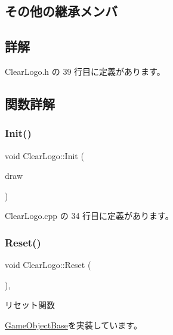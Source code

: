\subsection*{その他の継承メンバ}


\subsection{詳解}


 Clear\+Logo.\+h の 39 行目に定義があります。



\subsection{関数詳解}
\mbox{\label{class_clear_logo_a46c1a948342d75bb418047a31e70999d}} 
\subsubsection{\texorpdfstring{Init()}{Init()}}
{\footnotesize\ttfamily void Clear\+Logo\+::\+Init (\begin{DoxyParamCaption}\item[{\mbox{\hyperlink{class_draw_base}{Draw\+Base}} $\ast$}]{draw }\end{DoxyParamCaption})}



 Clear\+Logo.\+cpp の 34 行目に定義があります。

\mbox{\label{class_clear_logo_aa19369cbace0cc79957ef7b4d4dbd0f5}} 
\subsubsection{\texorpdfstring{Reset()}{Reset()}}
{\footnotesize\ttfamily void Clear\+Logo\+::\+Reset (\begin{DoxyParamCaption}{ }\end{DoxyParamCaption})\hspace{0.3cm}{\ttfamily [override]}, {\ttfamily [virtual]}}



リセット関数 



\mbox{\hyperlink{class_game_object_base_a85c59554f734bcb09f1a1e18d9517dce}{Game\+Object\+Base}}を実装しています。



